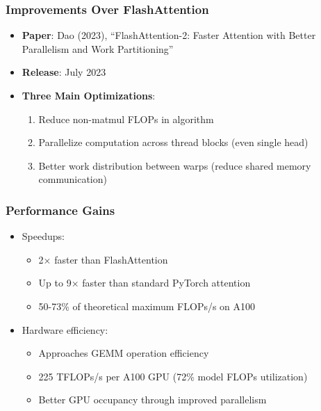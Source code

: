 \documentclass[11pt]{article}
\begin{document}
\subsubsection{Improvements Over FlashAttention}
\begin{itemize}[leftmargin=*]
    \item \textbf{Paper}: Dao (2023), ``FlashAttention-2: Faster Attention with Better Parallelism and Work Partitioning''~\cite{dao2023flashattention2}
    \item \textbf{Release}: July 2023
    \item \textbf{Three Main Optimizations}:
    \begin{enumerate}
        \item Reduce non-matmul FLOPs in algorithm
        \item Parallelize computation across thread blocks (even single head)
        \item Better work distribution between warps (reduce shared memory communication)
    \end{enumerate}
\end{itemize}

\subsubsection{Performance Gains}
\begin{itemize}[leftmargin=*]
    \item Speedups:
    \begin{itemize}
        \item 2× faster than FlashAttention
        \item Up to 9× faster than standard PyTorch attention
        \item 50-73\% of theoretical maximum FLOPs/s on A100
    \end{itemize}
    \item Hardware efficiency:
    \begin{itemize}
        \item Approaches GEMM operation efficiency
        \item 225 TFLOPs/s per A100 GPU (72\% model FLOPs utilization)
        \item Better GPU occupancy through improved parallelism
    \end{itemize}
\end{itemize}
\end{document}
